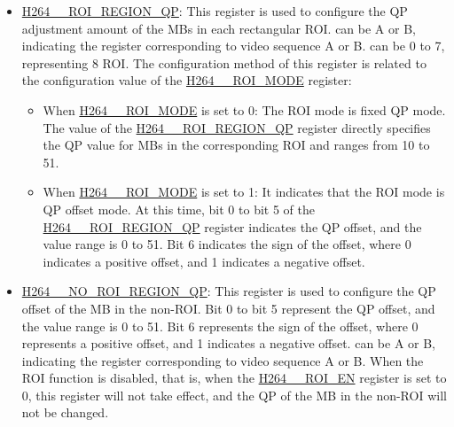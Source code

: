 \documentclass[main\_\_EN.tex]{subfiles}
\begin{document}
\begin{itemize}
\begin{itemize}
            \item \hyperref[fielddesc:H264AROIREGION0Y]{H264\_\_ROI\_REGION\_Y}: Configure the vertical starting MB coordinates of the ROI  in a frame of video.
            \item \hyperref[fielddesc:H264AROIREGION0XLEN]{H264\_\_ROI\_REGION\_X\_LEN}: Configure the number of horizontal MBs in the ROI  in a frame of video.
            \item \hyperref[fielddesc:H264AROIREGION0YLEN]{H264\_\_ROI\_REGION\_Y\_LEN}: Configure the number of vertical MBs in the ROI  in a frame of video.
        \end{itemize}
    \item \hyperref[fielddesc:H264AROIREGION0QP]{H264\_\_ROI\_REGION\_QP}: This register is used to configure the QP adjustment amount of the MBs in each rectangular ROI.  can be A or B, indicating the register corresponding to video sequence A or B.  can be 0 to 7, representing 8 ROI. The configuration method of this register is related to the configuration value of the \hyperref[fielddesc:H264AROIMODE]{H264\_\_ROI\_MODE} register:
        \begin{itemize}
            \item When \hyperref[fielddesc:H264AROIMODE]{H264\_\_ROI\_MODE} is set to 0: The ROI mode is fixed QP mode. The value of the \hyperref[fielddesc:H264AROIREGION0QP]{H264\_\_ROI\_REGION\_QP} register directly specifies the QP value for MBs in the corresponding ROI and ranges from 10 to 51.
            \item When \hyperref[fielddesc:H264AROIMODE]{H264\_\_ROI\_MODE} is set to 1: It indicates that the ROI mode is QP offset mode. At this time, bit 0 to bit 5 of the \hyperref[fielddesc:H264AROIREGION0QP]{H264\_\_ROI\_REGION\_QP} register indicates the QP offset, and the value range is 0 to 51. Bit 6 indicates the sign of the offset, where 0 indicates a positive offset, and 1 indicates a negative offset.
        \end{itemize}
    \item \hyperref[fielddesc:H264ANOROIREGIONQP]{H264\_\_NO\_ROI\_REGION\_QP}: This register is used to configure the QP offset of the MB in the non-ROI. Bit 0 to bit 5 represent the QP offset, and the value range is 0 to 51. Bit 6 represents the sign of the offset, where 0 represents a positive offset, and 1 indicates a negative offset.  can be A or B, indicating the register corresponding to video sequence A or B. When the ROI function is disabled, that is, when the \hyperref[fielddesc:H264AROIEN]{H264\_\_ROI\_EN} register is set to 0, this register will not take effect, and the QP of the MB in the non-ROI will not be changed.
\end{itemize}
\end{document}
